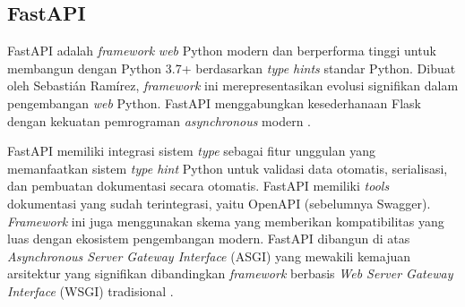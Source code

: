 \subsection{FastAPI}
\label{subsec:fastapi}

FastAPI adalah \emph{framework} \emph{web} Python modern dan berperforma tinggi untuk membangun \api{} dengan Python 3.7+ berdasarkan \emph{type hints} standar Python. Dibuat oleh Sebastián Ramírez, \emph{framework} ini merepresentasikan evolusi signifikan dalam pengembangan \emph{web} Python. FastAPI menggabungkan kesederhanaan Flask dengan kekuatan pemrograman \emph{asynchronous} modern \parencite{ramirez2020fastapi}.

FastAPI memiliki integrasi sistem \emph{type} sebagai fitur unggulan yang memanfaatkan sistem \emph{type hint} Python untuk validasi data otomatis, serialisasi, dan pembuatan dokumentasi secara otomatis. FastAPI memiliki \emph{tools} dokumentasi yang sudah terintegrasi, yaitu OpenAPI (sebelumnya Swagger). \emph{Framework} ini juga menggunakan skema \json yang memberikan kompatibilitas yang luas dengan ekosistem pengembangan modern. FastAPI dibangun di atas \emph{Asynchronous Server Gateway Interface} (ASGI) yang mewakili kemajuan arsitektur yang signifikan dibandingkan \emph{framework} berbasis \emph{Web Server Gateway Interface} (WSGI) tradisional \parencite{ramirez2020fastapi}. 




